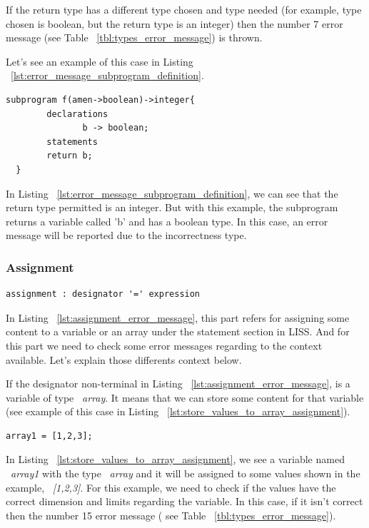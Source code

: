 \documentclass[
  oneside,
  11pt, a4paper,
  footinclude=true,
  headinclude=true,
  cleardoublepage=empty
]{scrbook}
\begin{document}
If the return type has a different type chosen and type needed (for example, type chosen is boolean, but the return type is an integer) then the number 7 error message (see Table ~\ref{tbl:types_error_message}) is thrown.

Let's see an example of this case in Listing ~\ref{lst:error_message_subprogram_definition}.

\begin{lstlisting}[label={lst:error_message_subprogram_definition},caption={Example of error message in LISS for subprogram\_definition non\_terminal}]
  subprogram f(amen->boolean)->integer{
        declarations
               b -> boolean;
        statements
        return b;
  }
\end{lstlisting}

In Listing ~\ref{lst:error_message_subprogram_definition}, we can see that the return type permitted is an integer. But with this example, the subprogram returns a variable called 'b' and has a boolean type. In this case, an error message will be reported due to the incorrectness type.

\subsubsection{Assignment}

\begin{lstlisting}[label={lst:assignment_error_message},caption={Assignment rule in LISS}]
  assignment : designator '=' expression
\end{lstlisting}

In Listing ~\ref{lst:assignment_error_message}, this part refers for assigning some content to a variable or an array under the statement section in LISS.
And for this part we need to check some error messages regarding to the context available.
Let's explain those differents context below.

If the designator non-terminal in Listing ~\ref{lst:assignment_error_message}, is a variable of type ~\textit{array}. It means that we can store some content for that variable (see example of this case in Listing ~\ref{lst:store_values_to_array_assignment}).

\begin{lstlisting}[caption={Example of storing some values to an array variable},label={lst:store_values_to_array_assignment}]
  array1 = [1,2,3];
\end{lstlisting}

In Listing ~\ref{lst:store_values_to_array_assignment}, we see a variable named ~\textit{array1} with the type ~\textit{array} and it will be assigned to some values shown in the example, ~\textit{[1,2,3]}. For this example, we need to check if the values have the correct dimension and limits regarding the variable. In this case, if it isn't correct then the number 15 error message ( see Table ~\ref{tbl:types_error_message}).
\end{document}
